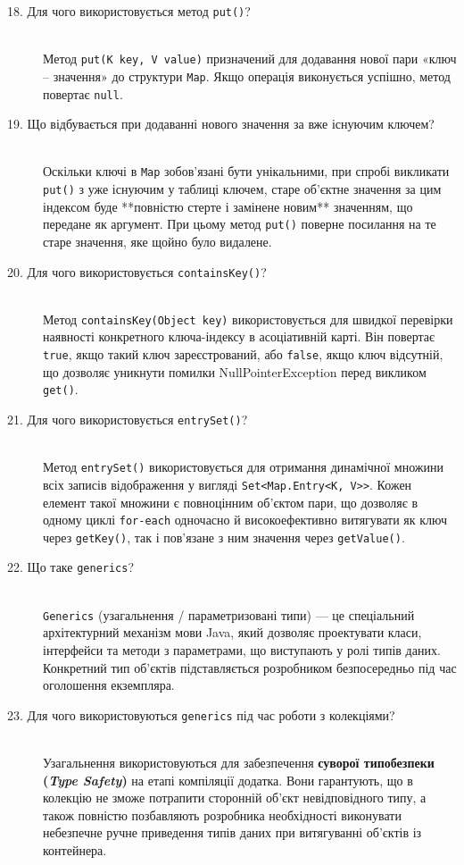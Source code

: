 \begin{description}
    \item[18. Для чого використовується метод \texttt{put()}?] ~\\
    Метод \texttt{put(K key, V value)} призначений для додавання нової пари «ключ -- значення» до структури \texttt{Map}. Якщо операція виконується успішно, метод повертає \texttt{null}.

    \item[19. Що відбувається при додаванні нового значення за вже існуючим ключем?] ~\\
    Оскільки ключі в \texttt{Map} зобов'язані бути унікальними, при спробі викликати \texttt{put()} з уже існуючим у таблиці ключем, старе об'єктне значення за цим індексом буде **повністю стерте і замінене новим** значенням, що передане як аргумент. При цьому метод \texttt{put()} поверне посилання на те старе значення, яке щойно було видалене.

    \item[20. Для чого використовується \texttt{containsKey()}?] ~\\
    Метод \texttt{containsKey(Object key)} використовується для швидкої перевірки наявності конкретного ключа-індексу в асоціативній карті. Він повертає \texttt{true}, якщо такий ключ зареєстрований, або \texttt{false}, якщо ключ відсутній, що дозволяє уникнути помилки NullPointerException перед викликом \texttt{get()}.

    \item[21. Для чого використовується \texttt{entrySet()}?] ~\\
    Метод \texttt{entrySet()} використовується для отримання динамічної множини всіх записів відображення у вигляді \texttt{Set<Map.Entry<K, V>>}. Кожен елемент такої множини є повноцінним об'єктом пари, що дозволяє в одному циклі \texttt{for-each} одночасно й високоефективно витягувати як ключ через \texttt{getKey()}, так і пов'язане з ним значення через \texttt{getValue()}.

    \item[22. Що таке \texttt{generics}?] ~\\
    \texttt{Generics} (узагальнення / параметризовані типи) — це спеціальний архітектурний механізм мови Java, який дозволяє проектувати класи, інтерфейси та методи з параметрами, що виступають у ролі типів даних. Конкретний тип об'єктів підставляється розробником безпосередньо під час оголошення екземпляра.

    \item[23. Для чого використовуються \texttt{generics} під час роботи з колекціями?] ~\\
    Узагальнення використовуються для забезпечення \textbf{суворої типобезпеки (\textit{Type Safety})} на етапі компіляції додатка. Вони гарантують, що в колекцію не зможе потрапити сторонній об'єкт невідповідного типу, а також повністю позбавляють розробника необхідності виконувати небезпечне ручне приведення типів даних при витягуванні об'єктів із контейнера.


\end{description}
